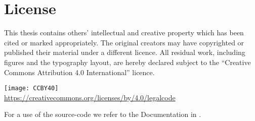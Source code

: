 \chapter{License}
\label{bm:license}

This thesis contains others' intellectual and creative property which has been cited or marked appropriately. The original creators may have copyrighted or published their material under a different licence. All residual work, including figures and the typography layout, are hereby declared subject to the \enquote{Creative Commons Attribution 4.0 International} licence.
\begin{center}
	\texttt{[image: CCBY40]}\\
	\url{https://creativecommons.org/licenses/by/4.0/legalcode}
\end{center} 
For a use of the source-code we refer to the Documentation in  .